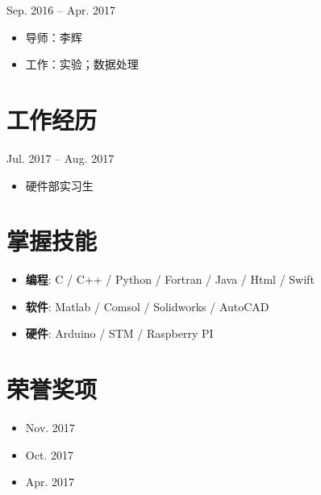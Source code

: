 \documentclass{resume}
\begin{document}
     {Sep. 2016 -- Apr. 2017}
\begin{itemize}
  \item 导师：李辉
  \item 工作：实验；数据处理
\end{itemize}

\section{工作经历}
         {Jul. 2017 -- Aug. 2017}
\begin{itemize}
  \item 硬件部实习生
\end{itemize}

\section{掌握技能}
\begin{itemize}[parsep=0.5ex]
  \item \textbf{编程}: C / C++ / Python / Fortran / Java / Html / Swift
  \item \textbf{软件}: Matlab / Comsol / Solidworks / AutoCAD
  \item \textbf{硬件}: Arduino / STM / Raspberry PI
\end{itemize}

\section{荣誉奖项}
\begin{itemize}[parsep=0.5ex]
  \item {}           {Nov. 2017}
  \item {}                    {Oct. 2017}
  \item {} {Apr. 2017}
\end{itemize}
\end{document}
